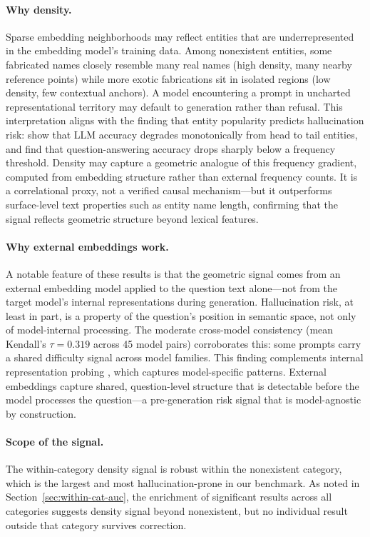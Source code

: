 \paragraph{Why density.} Sparse embedding neighborhoods may reflect entities that are underrepresented in the embedding model's training data. Among nonexistent entities, some fabricated names closely resemble many real names (high density, many nearby reference points) while more exotic fabrications sit in isolated regions (low density, few contextual anchors). A model encountering a prompt in uncharted representational territory may default to generation rather than refusal. This interpretation aligns with the finding that entity popularity predicts hallucination risk: \citet{sun2024entity} show that LLM accuracy degrades monotonically from head to tail entities, and \citet{mallen2023when} find that question-answering accuracy drops sharply below a frequency threshold. Density may capture a geometric analogue of this frequency gradient, computed from embedding structure rather than external frequency counts. It is a correlational proxy, not a verified causal mechanism---but it outperforms surface-level text properties such as entity name length, confirming that the signal reflects geometric structure beyond lexical features.

\paragraph{Why external embeddings work.} A notable feature of these results is that the geometric signal comes from an external embedding model applied to the question text alone---not from the target model's internal representations during generation. Hallucination risk, at least in part, is a property of the question's position in semantic space, not only of model-internal processing. The moderate cross-model consistency (mean Kendall's $\tau = 0.319$ across 45 model pairs) corroborates this: some prompts carry a shared difficulty signal across model families. This finding complements internal representation probing \citep{marks2023geometry, li2024inferencetime}, which captures model-specific patterns. External embeddings capture shared, question-level structure that is detectable before the model processes the question---a pre-generation risk signal that is model-agnostic by construction.

\paragraph{Scope of the signal.} The within-category density signal is robust within the nonexistent category, which is the largest and most hallucination-prone in our benchmark. As noted in Section~\ref{sec:within-cat-auc}, the enrichment of significant results across all categories suggests density signal beyond nonexistent, but no individual result outside that category survives correction.


